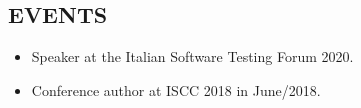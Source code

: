 \documentclass[margin]{res}
\begin{document}
\begin{resume}

			
		
		\section{EVENTS}
			\begin{itemize}
			    \item[] Speaker at the Italian Software Testing Forum 2020.
				\item[] Conference author at ISCC 2018 in June/2018.
			\end{itemize}


\end{resume}
\end{document}
